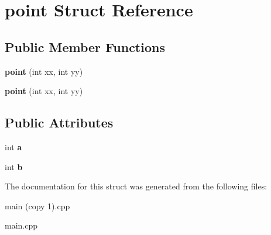 \hypertarget{structpoint}{}\section{point Struct Reference}
\label{structpoint}
\subsection*{Public Member Functions}
\begin{DoxyCompactItemize}
\item 
\mbox{\label{structpoint_ae3ea6069972ff26050dc8469d4765a0a}} 
{\bfseries point} (int xx, int yy)
\item 
\mbox{\label{structpoint_ae3ea6069972ff26050dc8469d4765a0a}} 
{\bfseries point} (int xx, int yy)
\end{DoxyCompactItemize}
\subsection*{Public Attributes}
\begin{DoxyCompactItemize}
\item 
\mbox{\label{structpoint_ad547af59ea2414940abdbc9ef985e753}} 
int {\bfseries a}
\item 
\mbox{\label{structpoint_ad2215fb25f631d5f4055fc6138306e7c}} 
int {\bfseries b}
\end{DoxyCompactItemize}


The documentation for this struct was generated from the following files\+:\begin{DoxyCompactItemize}
\item 
main (copy 1).\+cpp\item 
main.\+cpp\end{DoxyCompactItemize}
